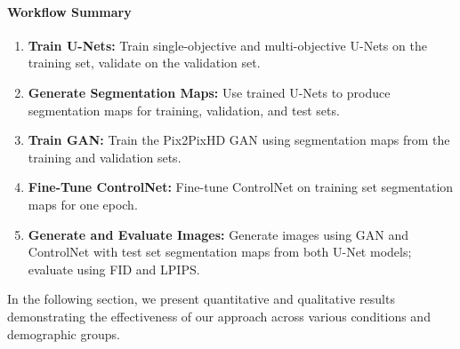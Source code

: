 \paragraph{Workflow Summary}  
\begin{enumerate}
    \item \textbf{Train U-Nets:} Train single-objective and multi-objective U-Nets on the training set, validate on the validation set.
    \item \textbf{Generate Segmentation Maps:} Use trained U-Nets to produce segmentation maps for training, validation, and test sets.
    \item \textbf{Train GAN:} Train the Pix2PixHD GAN using segmentation maps from the training and validation sets.
    \item \textbf{Fine-Tune ControlNet:} Fine-tune ControlNet on training set segmentation maps for one epoch.
    \item \textbf{Generate and Evaluate Images:} Generate images using GAN and ControlNet with test set segmentation maps from both U-Net models; evaluate using FID and LPIPS.
\end{enumerate}

In the following section, we present quantitative and qualitative results demonstrating the effectiveness of our approach across various conditions and demographic groups.
